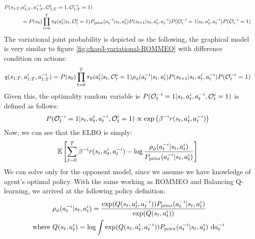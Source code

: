 \begin{equation}
\begin{aligned}
    P(s_{1:T}, &a^i_{1:T}, a^{-i}_{1:T}, \mathcal{O}^i_{1:T} = 1, \mathcal{O}^{-i}_{1:T} = 1) \\
    &= P(s_0) \prod^T_{t=0} \pi_\theta(a^i_t | s_t, \mathcal{O}^{i}_{t} = 1) P_{\text{prior}}(a^{-i}_t | s_t, a^i_t) P(s_{t+1} | s_t, a^i_t, a^{-i}_t) P(\mathcal{O}^{-i}_t = 1 | s_t, a^i_t, a^{-i}_t) P(\mathcal{O}^{-i}_t = 1)
\end{aligned}
\end{equation}
The variational joint probability is depicted as the following, the graphical model is very similar to figure \ref{fig:chap3-variational-ROMMEO} with difference condition on actions: 
\begin{equation}
    q(s_{1:T}, a_{1:T}^i, a^{-i}_{1:T}) = P(s_0) \prod^T_{t=0} \pi_\theta(a^i_t | s_t, \mathcal{O}^{i}_{t} = 1) \rho_{\phi}(a^{-i}_t | s_t, a^i_t) P(s_{t+1} | s_t, a^i_t, a^{-i}_t)P(\mathcal{O}^{-i}_t = 1)
\end{equation}
Given this, the optimality random variable is $P(\mathcal{O}_t^{-i} = 1 | s_t, a^i_t, a^{-i}_t, \mathcal{O}^{i}_t = 1)$ is defined as follows:
\begin{equation}
P(\mathcal{O}_t^{-i} = 1 | s_t, a^i_t, a^{-i}_t, \mathcal{O}^{i}_t = 1) \propto \exp \left(  \beta^{-i} r(s_t, a^i_t, a^{-i}_t)   \right)
\end{equation}
Now, we can see that the ELBO is simply:
\begin{equation}
    \mathbb{E}\left[ \sum^T_{t=0} \beta^{-i} r(s_t, a^i_t, a^{-i}_t) - \log \frac{\rho_{\phi}(a^{-i}_t | s_t, a^i_t)}{ P_{\text{prior}}(a^{-i}_t | s_t, a^i_t)} \right]
\end{equation}
We can solve only for the opponent model, since we assume we have knowledge of agent's optimal policy. With the same working as ROMMEO and Balancing Q-learning, we arrived at the following policy definition:
\begin{equation}
\begin{aligned}
\label{eqn:chap3-prob-opponent}
    &\rho_{\phi}(a^{-i}_t | s_t, a^i_t) = \frac{\exp(Q(s_t, a^i_t, a^{-i}_t))P_{\text{prior}}(a^{-i}_t | s_t, a^i_t)}{\exp(Q(s_t, a^{i}_t))} \\
    \text{ where }&Q(s_t, a^{i}_t) = \log \int \exp(Q(s_t, a^i_t, a^{-i}_t))P_{\text{prior}}(a^{-i}_t | s_t, a^i_t) \ \mathrm{d} a^{-i}_t \\
\end{aligned}
\end{equation}
